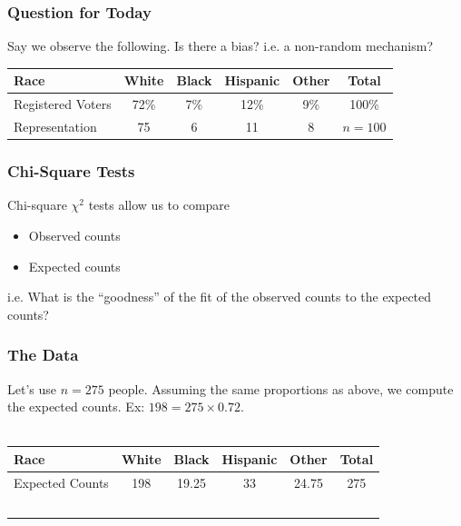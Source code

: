 \documentclass[handout]{beamer}
\newcommand{\blue}[1]{\textcolor{blue2}{#1}}
\newcommand{\white}[1]{\textcolor{white}{#1}}
\begin{document}
\begin{frame}[fragile]
\frametitle{Question for Today}

Say we observe the following.  Is there a bias?  i.e. a non-random mechanism?

\begin{center}
\begin{tabular}{l||cccc|c}
Race & White & Black & Hispanic & Other & Total \\ 
\hline
Registered Voters & 72\% & 7\% & 12\% & 9\% & 100\%\\ 
Representation & 75 & 6 & 11 & 8 & $n=100$ \\ 
\end{tabular}
\end{center}

\end{frame}


\begin{frame}[fragile]
\frametitle{Chi-Square Tests}

\blue{Chi-square $\chi^2$ tests} allow us to compare
\begin{itemize}
\item Observed counts
\item Expected counts
\end{itemize}

\vspace{0.5cm}

\pause i.e. What is the \blue{``goodness''} of the fit of the observed counts to the expected counts?



\end{frame}


\begin{frame}[fragile]
\frametitle{The Data}

Let's use $n=275$ people.  Assuming the same proportions as above,  we compute the \blue{expected} counts.  Ex: $198 = 275 \times 0.72$.  \white{Now say we observe the following counts:}

\begin{center}
\begin{tabular}{l||cccc|c}
Race & White & Black & Hispanic & Other & Total \\ 
\hline
Expected Counts & 198 & 19.25 & 33 & 24.75 & 275\\ 
\white{Observed Counts} & \white{205} & \white{26} & \white{25} & \white{19} & \white{275}\\ 
\end{tabular}
\end{center}

\end{frame}
\end{document}
